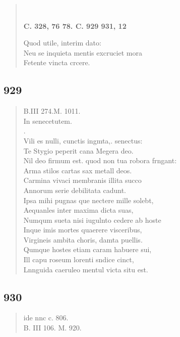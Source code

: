 \documentclass[11pt, a4paper]{report}
\begin{document}
\begin{verse}
        ﻿\pagebreak 
    \begin{center} \textbf{C. 328, 76 78. C. 929 931, 12} \end{center} \marginpar{[352]} Quod utile, interim dato: \\ Neu se inquieta mentis excruciet mora \\ Fetente vincta crcere. \\ 
      \end{verse}
  
            \subsection*{929}
      \begin{verse}
      B.III 274.M. 1011. \\ In senecetutem. \\ . \\ Vili es nulli, cunctis ingmta,. senectus: \\ Te Stygio peperit cana Megera deo. \\ Nil deo firmum est. quod non tua robora frngant: \\ Arma stilos cartas sax metall deos. \\ Carmina vivaci membranis illita succo \\ Annorum serie debilitata cadunt. \\ Ipsa mihi pugnas que nectere mille solebt, \\ Aequanles inter maxima dicta suas, \\ Numqum sueta nisi iugulnto cedere ab hoste \\ Inque imis mortes quaerere visceribus, \\ Virgineis ambita choris, damta puellis. \\ Qumque hostes etiam caram habuere sui, \\ Ill capu roseum lorenti sndice cinct, \\ Lnnguida caeruleo mentul victa situ est. \\ 
      \end{verse}
  
            \subsection*{930}
      \begin{verse}
      ide nnc c. 806. \\ B. III 106. M. 920. \\ 
      \end{verse}
  
\end{document}
